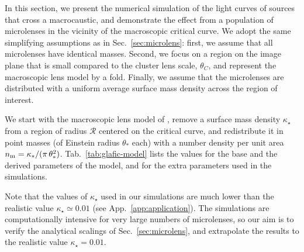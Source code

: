 \documentclass{aastex6}
\newcommand{\refsec}[1]{Sec.~\ref{sec:#1}}
\newcommand{\refapp}[1]{App.~\ref{app:#1}}
\newcommand{\reftab}[1]{Tab.~\ref{tab:#1}}
\begin{document}
In this section, we present the numerical simulation of the light curves of sources that cross a macrocaustic, and demonstrate the effect from a population of microlenses in the vicinity of the macroscopic critical curve.  We adopt the same simplifying assumptions as in \refsec{microlens}: first, we assume that all microlenses have identical masses. Second, we focus on a region on the image plane that is small compared to the cluster lens scale, $\theta_C$, and represent the macroscopic lens model by a fold. Finally, we assume that the microlenses are distributed with a uniform average surface mass density across the region of interest. 

We start with the macroscopic lens model of \cite{Kawamata:2015haa}, remove a surface mass density $\kappa_\star$ from a region of radius $\mathcal{R}$ centered on the critical curve, and redistribute it in point masses (of Einstein radius $\theta_*$ each) with a number density per unit area $n_{\rm m} = \kappa_*/(\pi\,\theta_*^2)$. \reftab{glafic-model} lists the values for the base and the derived parameters of the model, and for the extra parameters used in the simulations. 

Note that the values of $\kappa_\star$ used in our simulations are much lower than the realistic value $\kappa_\star \simeq 0.01$ (see \refapp{application}). The simulations are computationally intensive for very large numbers of microlenses, so our aim is to verify the analytical scalings of \refsec{microlens}, and extrapolate the results to the realistic value $\kappa_\star = 0.01$.
\end{document}
